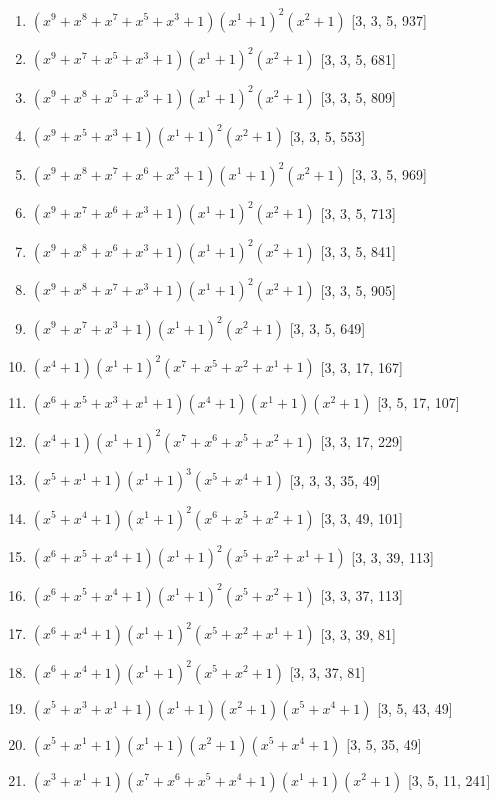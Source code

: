 \documentclass[10pt,twocolumn]{article}
\begin{document}
\begin{enumerate}
\item $(x^{9} + x^{8} + x^{7} + x^{5} + x^{3} + 1)(x^{1} + 1)^{2}(x^{2} + 1)$  [3, 3, 5, 937]
\item $(x^{9} + x^{7} + x^{5} + x^{3} + 1)(x^{1} + 1)^{2}(x^{2} + 1)$  [3, 3, 5, 681]
\item $(x^{9} + x^{8} + x^{5} + x^{3} + 1)(x^{1} + 1)^{2}(x^{2} + 1)$  [3, 3, 5, 809]
\item $(x^{9} + x^{5} + x^{3} + 1)(x^{1} + 1)^{2}(x^{2} + 1)$  [3, 3, 5, 553]
\item $(x^{9} + x^{8} + x^{7} + x^{6} + x^{3} + 1)(x^{1} + 1)^{2}(x^{2} + 1)$  [3, 3, 5, 969]
\item $(x^{9} + x^{7} + x^{6} + x^{3} + 1)(x^{1} + 1)^{2}(x^{2} + 1)$  [3, 3, 5, 713]
\item $(x^{9} + x^{8} + x^{6} + x^{3} + 1)(x^{1} + 1)^{2}(x^{2} + 1)$  [3, 3, 5, 841]
\item $(x^{9} + x^{8} + x^{7} + x^{3} + 1)(x^{1} + 1)^{2}(x^{2} + 1)$  [3, 3, 5, 905]
\item $(x^{9} + x^{7} + x^{3} + 1)(x^{1} + 1)^{2}(x^{2} + 1)$  [3, 3, 5, 649]
\item $(x^{4} + 1)(x^{1} + 1)^{2}(x^{7} + x^{5} + x^{2} + x^{1} + 1)$  [3, 3, 17, 167]
\item $(x^{6} + x^{5} + x^{3} + x^{1} + 1)(x^{4} + 1)(x^{1} + 1)(x^{2} + 1)$  [3, 5, 17, 107]
\item $(x^{4} + 1)(x^{1} + 1)^{2}(x^{7} + x^{6} + x^{5} + x^{2} + 1)$  [3, 3, 17, 229]
\item $(x^{5} + x^{1} + 1)(x^{1} + 1)^{3}(x^{5} + x^{4} + 1)$  [3, 3, 3, 35, 49]
\item $(x^{5} + x^{4} + 1)(x^{1} + 1)^{2}(x^{6} + x^{5} + x^{2} + 1)$  [3, 3, 49, 101]
\item $(x^{6} + x^{5} + x^{4} + 1)(x^{1} + 1)^{2}(x^{5} + x^{2} + x^{1} + 1)$  [3, 3, 39, 113]
\item $(x^{6} + x^{5} + x^{4} + 1)(x^{1} + 1)^{2}(x^{5} + x^{2} + 1)$  [3, 3, 37, 113]
\item $(x^{6} + x^{4} + 1)(x^{1} + 1)^{2}(x^{5} + x^{2} + x^{1} + 1)$  [3, 3, 39, 81]
\item $(x^{6} + x^{4} + 1)(x^{1} + 1)^{2}(x^{5} + x^{2} + 1)$  [3, 3, 37, 81]
\item $(x^{5} + x^{3} + x^{1} + 1)(x^{1} + 1)(x^{2} + 1)(x^{5} + x^{4} + 1)$  [3, 5, 43, 49]
\item $(x^{5} + x^{1} + 1)(x^{1} + 1)(x^{2} + 1)(x^{5} + x^{4} + 1)$  [3, 5, 35, 49]
\item $(x^{3} + x^{1} + 1)(x^{7} + x^{6} + x^{5} + x^{4} + 1)(x^{1} + 1)(x^{2} + 1)$  [3, 5, 11, 241]

\end{enumerate}
\end{document}
